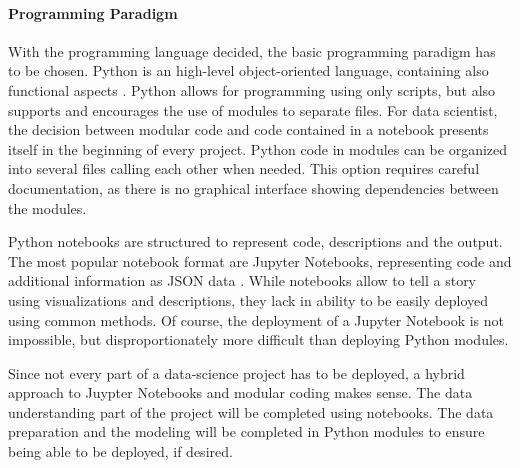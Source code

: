 \paragraph{Programming Paradigm}
With the programming language decided, the basic programming paradigm has to be chosen. Python is an high-level object-oriented language, containing also functional aspects \cite[ch.~1.3.2]{corePython}. Python allows for programming using only scripts, but also supports and encourages the use of modules to separate files.
For data scientist, the decision between modular code and code contained in a notebook presents itself in the beginning of every project. Python code in modules can be organized into several files calling each other when needed. This option requires careful documentation, as there is no graphical interface showing dependencies between the modules.

Python notebooks are structured to represent code, descriptions and the output. The most popular notebook format are Jupyter Notebooks, representing code and additional information as \ac{JSON} data \cite{jupyterteramArchitecture}.
While notebooks allow to tell a story using visualizations and descriptions, they lack in ability to be easily deployed using common methods. Of course, the deployment of a Jupyter Notebook is not impossible, but disproportionately more difficult than deploying Python modules.

Since not every part of a data-science project has to be deployed, a hybrid approach to Juypter Notebooks and modular coding makes sense. The data understanding part of the project will be completed using notebooks. The data preparation and the modeling will be completed in Python modules to ensure being able to be deployed, if desired.












